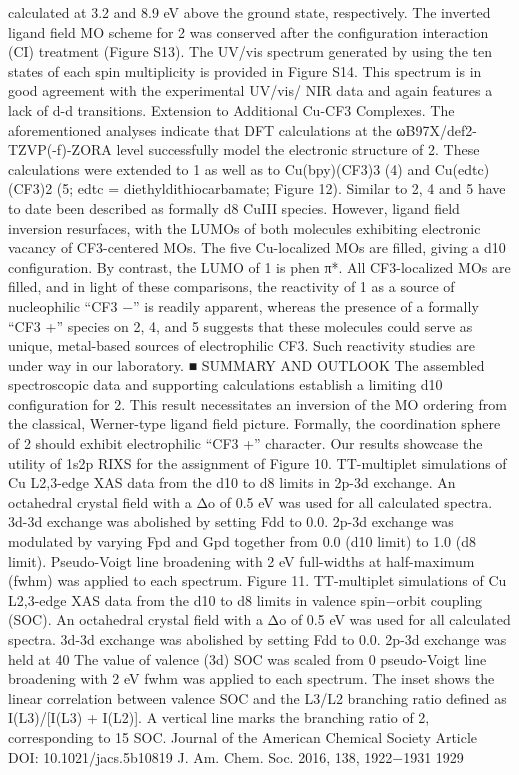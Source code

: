 calculated at 3.2 and 8.9 eV above the ground state,
respectively. The inverted ligand ﬁeld MO scheme for 2 was
conserved after the conﬁguration interaction (CI) treatment
(Figure S13). The UV/vis spectrum generated by using the ten
states of each spin multiplicity is provided in Figure S14. This
spectrum is in good agreement with the experimental UV/vis/
NIR data and again features a lack of d-d transitions.
Extension to Additional Cu-CF3 Complexes. The
aforementioned analyses indicate that DFT calculations at the
ωB97X/def2-TZVP(-f)-ZORA level successfully model the
electronic structure of 2. These calculations were extended to
1 as well as to Cu(bpy)(CF3)3 (4) and Cu(edtc)(CF3)2 (5;
edtc = diethyldithiocarbamate; Figure 12). Similar to 2, 4 and 5
have to date been described as formally d8 CuIII species.
However, ligand ﬁeld inversion resurfaces, with the LUMOs of
both molecules exhibiting electronic vacancy of CF3-centered
MOs. The ﬁve Cu-localized MOs are ﬁlled, giving a d10
conﬁguration. By contrast, the LUMO of 1 is phen π*. All
CF3-localized MOs are ﬁlled, and in light of these comparisons,
the reactivity of 1 as a source of nucleophilic “CF3
−” is readily
apparent, whereas the presence of a formally “CF3
+” species on
2, 4, and 5 suggests that these molecules could serve as unique,
metal-based sources of electrophilic CF3. Such reactivity studies
are under way in our laboratory.
■ SUMMARY AND OUTLOOK
The assembled spectroscopic data and supporting calculations
establish a limiting d10 conﬁguration for 2. This result
necessitates an inversion of the MO ordering from the classical,
Werner-type ligand ﬁeld picture. Formally, the coordination
sphere of 2 should exhibit electrophilic “CF3
+” character. Our
results showcase the utility of 1s2p RIXS for the assignment of
Figure 10. TT-multiplet simulations of Cu L2,3-edge XAS data from
the d10 to d8 limits in 2p-3d exchange. An octahedral crystal ﬁeld with a
Δo of 0.5 eV was used for all calculated spectra. 3d-3d exchange was
abolished by setting Fdd to 0.0. 2p-3d exchange was modulated by
varying Fpd and Gpd together from 0.0 (d10 limit) to 1.0 (d8 limit).
Pseudo-Voigt line broadening with 2 eV full-widths at half-maximum
(fwhm) was applied to each spectrum.
Figure 11. TT-multiplet simulations of Cu L2,3-edge XAS data from
the d10 to d8 limits in valence spin−orbit coupling (SOC). An
octahedral crystal ﬁeld with a Δo of 0.5 eV was used for all calculated
spectra. 3d-3d exchange was abolished by setting Fdd to 0.0. 2p-3d
exchange was held at 40%
The value of valence (3d) SOC was scaled from 0%
pseudo-Voigt line broadening with 2 eV fwhm was applied to each
spectrum. The inset shows the linear correlation between valence SOC
and the L3/L2 branching ratio deﬁned as I(L3)/[I(L3) + I(L2)]. A
vertical line marks the branching ratio of 2, corresponding to 15%
SOC.
Journal of the American Chemical Society
Article
DOI: 10.1021/jacs.5b10819
J. Am. Chem. Soc. 2016, 138, 1922−1931
1929


